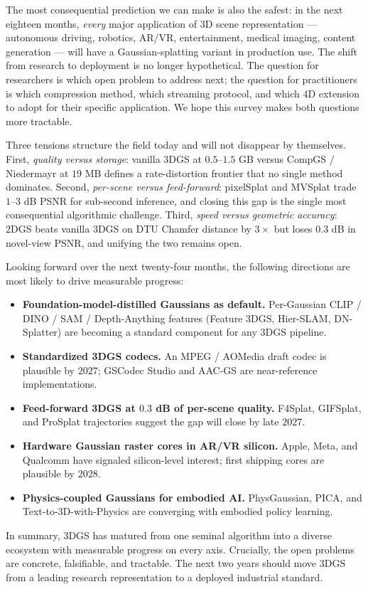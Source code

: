 \documentclass{article}
\begin{document}
The most consequential prediction we can make is also the safest: in the next eighteen months, \emph{every} major application of 3D scene representation --- autonomous driving, robotics, AR/VR, entertainment, medical imaging, content generation --- will have a Gaussian-splatting variant in production use. The shift from research to deployment is no longer hypothetical. The question for researchers is which open problem to address next; the question for practitioners is which compression method, which streaming protocol, and which 4D extension to adopt for their specific application. We hope this survey makes both questions more tractable.

Three tensions structure the field today and will not disappear by themselves. First, \emph{quality versus storage}: vanilla 3DGS at \(0.5\)--\(1.5\) GB versus CompGS / Niedermayr at \(19\) MB defines a rate-distortion frontier that no single method dominates. Second, \emph{per-scene versus feed-forward}: pixelSplat and MVSplat trade \(1\)--\(3\) dB PSNR for sub-second inference, and closing this gap is the single most consequential algorithmic challenge. Third, \emph{speed versus geometric accuracy}: 2DGS beats vanilla 3DGS on DTU Chamfer distance by \(3{\times}\) but loses \(0.3\) dB in novel-view PSNR, and unifying the two remains open.

Looking forward over the next twenty-four months, the following directions are most likely to drive measurable progress:

\begin{itemize}

\item
  \textbf{Foundation-model-distilled Gaussians as default.} Per-Gaussian CLIP / DINO / SAM / Depth-Anything features (Feature 3DGS, Hier-SLAM, DN-Splatter) are becoming a standard component for any 3DGS pipeline.
\item
  \textbf{Standardized 3DGS codecs.} An MPEG / AOMedia draft codec is plausible by \(2027\); GSCodec Studio and AAC-GS are near-reference implementations.
\item
  \textbf{Feed-forward 3DGS at \(0.3\) dB of per-scene quality.} F4Splat, GIFSplat, and ProSplat trajectories suggest the gap will close by late \(2027\).
\item
  \textbf{Hardware Gaussian raster cores in AR/VR silicon.} Apple, Meta, and Qualcomm have signaled silicon-level interest; first shipping cores are plausible by \(2028\).
\item
  \textbf{Physics-coupled Gaussians for embodied AI.} PhysGaussian, PICA, and Text-to-3D-with-Physics are converging with embodied policy learning.
\end{itemize}

In summary, 3DGS has matured from one seminal algorithm into a diverse ecosystem with measurable progress on every axis. Crucially, the open problems are concrete, falsifiable, and tractable. The next two years should move 3DGS from a leading research representation to a deployed industrial standard.



\end{document}
